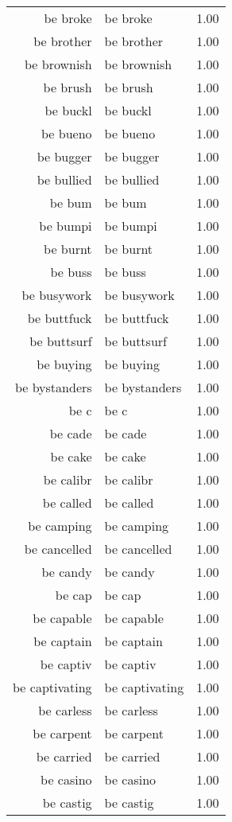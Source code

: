 \begin{table}[ht]
\begin{tabular}{rlr}
  be broke & be broke & 1.00 \\ 
  be brother & be brother & 1.00 \\ 
  be brownish & be brownish & 1.00 \\ 
  be brush & be brush & 1.00 \\ 
  be buckl & be buckl & 1.00 \\ 
  be bueno & be bueno & 1.00 \\ 
  be bugger & be bugger & 1.00 \\ 
  be bullied & be bullied & 1.00 \\ 
  be bum & be bum & 1.00 \\ 
  be bumpi & be bumpi & 1.00 \\ 
  be burnt & be burnt & 1.00 \\ 
  be buss & be buss & 1.00 \\ 
  be busywork & be busywork & 1.00 \\ 
  be buttfuck & be buttfuck & 1.00 \\ 
  be buttsurf & be buttsurf & 1.00 \\ 
  be buying & be buying & 1.00 \\ 
  be bystanders & be bystanders & 1.00 \\ 
  be c & be c & 1.00 \\ 
  be cade & be cade & 1.00 \\ 
  be cake & be cake & 1.00 \\ 
  be calibr & be calibr & 1.00 \\ 
  be called & be called & 1.00 \\ 
  be camping & be camping & 1.00 \\ 
  be cancelled & be cancelled & 1.00 \\ 
  be candy & be candy & 1.00 \\ 
  be cap & be cap & 1.00 \\ 
  be capable & be capable & 1.00 \\ 
  be captain & be captain & 1.00 \\ 
  be captiv & be captiv & 1.00 \\ 
  be captivating & be captivating & 1.00 \\ 
  be carless & be carless & 1.00 \\ 
  be carpent & be carpent & 1.00 \\ 
  be carried & be carried & 1.00 \\ 
  be casino & be casino & 1.00 \\ 
  be castig & be castig & 1.00 \\ 

\end{tabular}
\end{table}
